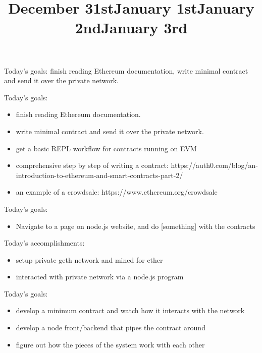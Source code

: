 \title{December 31st}

Today's goals: finish reading Ethereum documentation, write minimal contract and send it over the private network.


\title{January 1st}

Today's goals: 

\begin{itemize}
	\item finish reading Ethereum documentation.
	\item write minimal contract and send it over the private network.
	\item get a basic REPL workflow for contracts running on EVM 
\end{itemize}


\begin{itemize}
	\item comprehensive step by step of writing a contract: https://auth0.com/blog/an-introduction-to-ethereum-and-smart-contracts-part-2/
	\item an example of a crowdsale: https://www.ethereum.org/crowdsale
\end{itemize}


\title{January 2nd}

Today's goals:

\begin{itemize}
	\item Navigate to a page on node.js website, and do [something] with the contracts
\end{itemize}

Today's accomplishments:

\begin{itemize}
	\item setup private geth network and mined for ether
	\item interacted with private network via a node.js program
\end{itemize}


\title{January 3rd}

Today's goals:

\begin{itemize}
	\item develop a minimum contract and watch how it interacts with the network
	\item develop a node front/backend that pipes the contract around
	\item figure out how the pieces of the system work with each other
\end{itemize}


